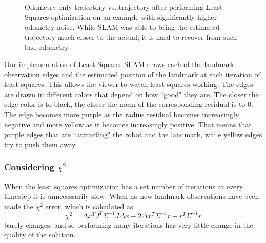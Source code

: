 \documentclass[12pt]{article}
\begin{document}
\begin{figure}[htb]
\label{fig:LSSLAM_noise}
\caption{Odometry only trajectory vs. trajectory after performing Least Squares optimization
on an example with significantly higher odometry noise. While SLAM was able to bring the
estimated trajectory much closer to the actual, it is hard to recover from such bad odometry.}
\end{figure}

Our implementation of Least Squares SLAM draws each of the landmark observation edges and the estimated position of the landmark at each iteration of least squares.  This allows the viewer to watch least squares working. The edges are drawn in different colors that depend on how ``good" they are.  The closer the edge color is to black, the closer the norm of the corresponding residual is to 0.  The edge becomes more purple as the radius residual becomes increasingly negative and more yellow as it becomes increasingly positive. That means that purple edges that are ``attracting" the robot and the landmark, while yellow edges try to push them away.

\subsubsection*{Considering $\chi^2$}
When the least squares optimization has a set number of iterations at every timestep it is unnecessarily slow.  When no new landmark observations have been made the $\chi^2$ error, which is calculated as
$$\chi^2 = \Delta x^TJ^T\Sigma^{-1}J\Delta x - 2\Delta x^T\Sigma^{-1}r + r^T\Sigma^{-1}r$$
barely changes, and so performing many iterations has very little change in the quality of the solution.
\end{document}
